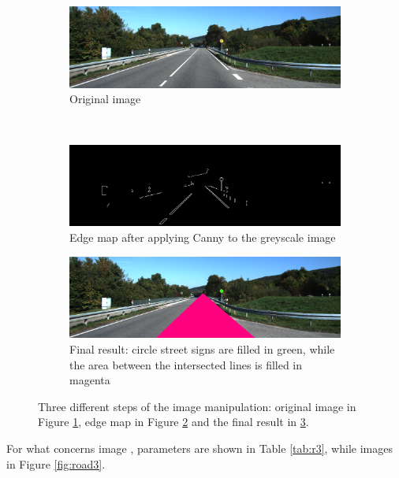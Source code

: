 \documentclass[twoside,onecolumn]{article}
\theoremstyle{definition}
\begin{document}
\begin{figure} \centering
\begin{subfigure}{0.8\textwidth}
  \includegraphics[width=\textwidth]{../images/road2.png}
\caption{Original image }\label{fig:r2fig}
\end{subfigure} \\
\begin{subfigure}{0.8\textwidth}
\includegraphics[width=\textwidth]{../results/edgeMap_road2.png}
\caption{Edge map after applying Canny to the greyscale image}\label{fig:r2edges}
\end{subfigure}
  \begin{subfigure}{0.8\textwidth}
\includegraphics[width=\textwidth]{../results/Circles_road2.png}
\caption{Final result: circle street signs are filled in green, while the area between the intersected lines is filled in magenta}\label{fig:r2circles}
\end{subfigure}\caption{Three different steps of the image manipulation: original image in Figure \ref{fig:r2fig}, edge map in Figure \ref{fig:r2edges} and the final result in \ref{fig:r2circles}. }\label{fig:road2}
\end{figure}
For what concerns image , parameters are shown in Table \ref{tab:r3}, while images in Figure \ref{fig:road3}.
\end{document}
